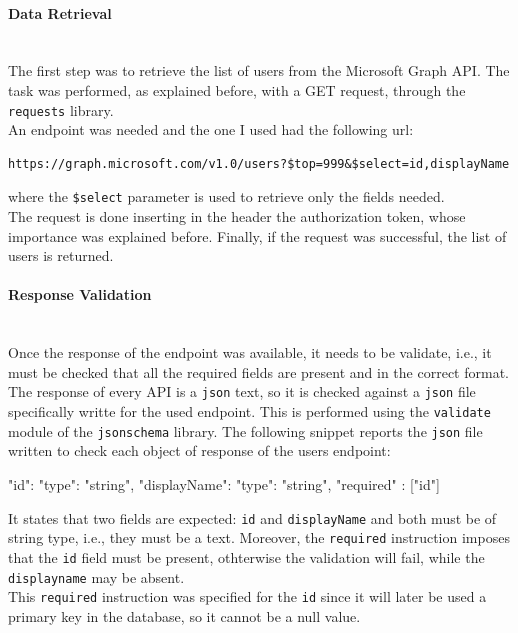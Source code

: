\documentclass[12pt, a4paper, oneside]{article}
\begin{document}
\paragraph{Data Retrieval} ~\\
The first step was to retrieve the list of users from the Microsoft Graph API. The task was performed, as explained before, with a GET request, through the \texttt{requests} library.\\
An endpoint was needed and the one I used had the following url:  
\begin{Verbatim}[fontsize=\small]
https://graph.microsoft.com/v1.0/users?$top=999&$select=id,displayName
\end{Verbatim}
where the \texttt{\$select} parameter is used to retrieve only the fields needed.\\
The request is done inserting in the header the authorization token, whose importance was explained before. Finally, if the request was successful, the list of users is returned.

\paragraph{Response Validation} ~\\
Once the response of the endpoint was available, it needs to be validate, i.e., it must be checked that all the required fields are present and in the correct format.\\
The response of every API is a \texttt{json} text, so it is checked against a \texttt{json} file specifically writte for the used endpoint. This is performed using the \texttt{validate} module of the 
\texttt{jsonschema} library.
The following snippet reports the \texttt{json} file written to check each object of response of the users endpoint:
\begin{python}
    {
    "id": {"type": "string"},
    "displayName": {"type": "string"},
    "required" : ["id"]
    }
\end{python}
It states that two fields are expected: \texttt{id} and \texttt{displayName} and both must be of string type, i.e., they must be a text. Moreover, the \texttt{required} instruction imposes that the \texttt{id} field
must be present, othterwise the validation will fail, while the \texttt{displayname} may be absent.\\
This \texttt{required} instruction was specified for the \texttt{id} since it will later be used a primary key in the database, so it cannot be a null value.
\end{document}
